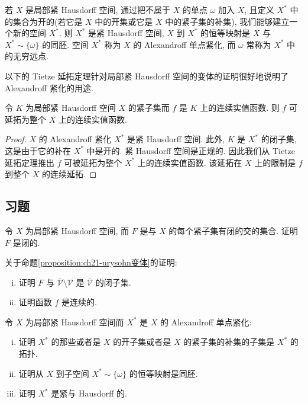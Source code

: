 \documentclass[../../main.tex]{subfiles}
\begin{document}
\begin{theorem}\label{theorem:ch21-alexandroff}
若 $X$ 是局部紧 Hausdorff 空间, 通过把不属于 $X$ 的单点 $\omega$ 加入 $X$, 且定义 $X^{*}$ 中的集合为开的(若它是 $X$ 中的开集或它是 $X$ 中的紧子集的补集), 我们能够建立一个新的空间 $X^{*}$. 则 $X^{*}$ 是紧 Hausdorff 空间, $X$ 到 $X^{*}$ 的恒等映射是 $X$ 与 $X^{*}\sim\{\omega\}$ 的同胚. 空间 $X^{*}$ 称为 $X$ 的 Alexandroff 单点紧化, 而 $\omega$ 常称为 $X^{*}$ 中的无穷远点.
\end{theorem}

以下的 Tietze 延拓定理针对局部紧 Hausdorff 空间的变体的证明很好地说明了 Alexandroff 紧化的用途.

\begin{theorem}\label{theorem:ch21-tietze延拓}
令 $K$ 为局部紧 Hausdorff 空间 $X$ 的紧子集而 $f$ 是 $K$ 上的连续实值函数. 则 $f$ 可延拓为整个 $X$ 上的连续实值函数.
\end{theorem}

\begin{proof}
$X$ 的 Alexandroff 紧化 $X^{*}$ 是紧 Hausdorff 空间. 此外, $K$ 是 $X^{*}$ 的闭子集, 这是由于它的补在 $X^{*}$ 中是开的. 紧 Hausdorff 空间是正规的. 因此我们从 Tietze 延拓定理推出 $f$ 可被延拓为整个 $X^{*}$ 上的连续实值函数. 该延拓在 $X$ 上的限制是 $f$ 到整个 $X$ 的连续延拓.
\end{proof}

\subsection*{习题}

\begin{exercise}\label{exercise:ch21-01}
令 $X$ 为局部紧 Hausdorff 空间, 而 $F$ 是与 $X$ 的每个紧子集有闭的交的集合. 证明 $F$ 是闭的.
\end{exercise}

\begin{exercise}\label{exercise:ch21-02}
关于命题\cref{proposition:ch21-urysohn变体}的证明:
\begin{enumerate}[(i)]
\item 证明 $F$ 与 $\overline{\mathcal{V}}\setminus\mathcal{V}$ 是 $\overline{\mathcal{V}}$ 的闭子集.
\item 证明函数 $f$ 是连续的.
\end{enumerate}
\end{exercise}

\begin{exercise}\label{exercise:ch21-03}
令 $X$ 为局部紧 Hausdorff 空间而 $X^{*}$ 是 $X$ 的 Alexandroff 单点紧化:
\begin{enumerate}[(i)]
\item 证明 $X^{*}$ 的那些或者是 $X$ 的开子集或者是 $X$ 的紧子集的补集的子集是 $X^{*}$ 的拓扑.
\item 证明从 $X$ 到子空间 $X^{*}\sim\{\omega\}$ 的恒等映射是同胚.
\item 证明 $X^{*}$ 是紧与 Hausdorff 的.
\end{enumerate}
\end{exercise}
\end{document}
